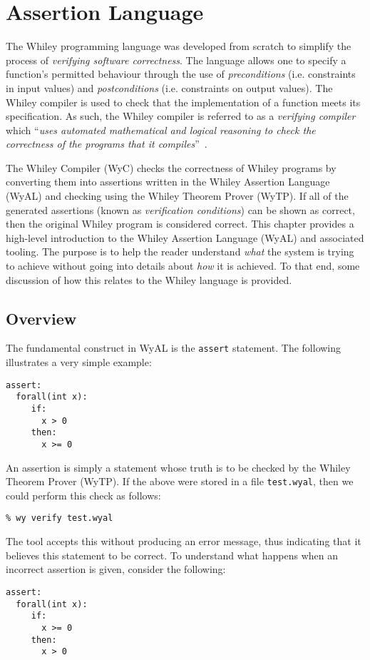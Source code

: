 \chapter{Assertion Language}

The Whiley programming language was developed from scratch to simplify
the process of {\em verifying software correctness}.  The language
allows one to specify a function's permitted behaviour through the use
of {\em preconditions} (i.e. constraints in input values) and {\em
  postconditions} (i.e. constraints on output values).  The Whiley
compiler is used to check that the implementation of a function meets
its specification.  As such, the Whiley compiler is referred to as a
{\em verifying compiler} which ``{\em uses automated mathematical and
  logical reasoning to check the correctness of the programs that it
  compiles}''~\cite{Hoare03}.

The Whiley Compiler (WyC) checks the correctness of Whiley programs by
converting them into assertions written in the Whiley Assertion
Language (WyAL) and checking using the Whiley Theorem Prover (WyTP).
If all of the generated assertions (known as {\em verification
  conditions}) can be shown as correct, then the original Whiley
program is considered correct.  This chapter provides a high-level
introduction to the Whiley Assertion Language (WyAL) and associated
tooling.  The purpose is to help the reader understand {\em what} the
system is trying to achieve without going into details about {\em how}
it is achieved.  To that end, some discussion of how this relates to
the Whiley language is provided.

\section{Overview}
The fundamental construct in WyAL is the \lstinline{assert} statement.
The following illustrates a very simple example:
\begin{lstlisting}[language=WyAL]
assert:
  forall(int x):
     if:
       x > 0
     then:
       x >= 0
\end{lstlisting}
An assertion is simply a statement whose truth is to be checked by the
Whiley Theorem Prover (WyTP).  If the above were stored in a file
\lstinline{test.wyal}, then we could perform this check as follows:
\begin{verbatim}
% wy verify test.wyal
\end{verbatim}
The tool accepts this without producing an error message, thus
indicating that it believes this statement to be correct.  To
understand what happens when an incorrect assertion is given, consider
the following:
\begin{lstlisting}[language=WyAL]
assert:
  forall(int x):
     if:
       x >= 0
     then:
       x > 0
\end{lstlisting}

